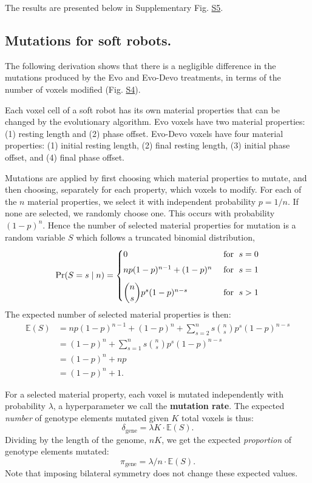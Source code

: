 The results are presented below in Supplementary Fig. \hyperref[fig:S5]{S5}.


\subsection{Mutations for soft robots.}

The following derivation shows that there is a negligible difference in the mutations produced by the Evo and Evo-Devo treatments, in terms of the number of voxels modified (Fig. \hyperref[fig:S4]{S4}). 

Each voxel cell of a soft robot has its own material properties that can be changed by the evolutionary algorithm.
Evo voxels have two material properties: (1) resting length and (2) phase offset.
Evo-Devo voxels have four material properties: (1) initial resting length, (2) final resting length, (3) initial phase offset, and (4) final phase offset.


Mutations are applied by first choosing which material properties to mutate, and then choosing, separately for each property, which voxels to modify.
For each of the $n$ material properties, we select it with independent probability $p=1/n$. 
If none are selected, we randomly choose one. This occurs with probability $\left(1-p\right)^n$.
Hence the number of selected material properties for mutation is a random variable $S$ which follows a truncated binomial distribution,
\begin{equation}
\text{Pr}(S = s \mid n) = 
	\begin{cases} 
        0 & \text{ for } \;  s = 0 \\[4pt]
        n p(1-p)^{n-1} + (1-p)^n & \text{ for } \;  s = 1 \\[8pt]
        \dbinom{n}{s} p^s (1-p)^{n-s} & \text{ for } \;  s > 1
	\end{cases}
\end{equation}
The expected number of selected material properties is then:
\begin{align}
\mathbb{E}(S) 
&=
np(1-p)^{n-1} + (1-p)^n + \sum_{s=2}^n s \binom{n}{s} p^s (1-p)^{n-s} \\
&= 
(1-p)^n + \sum_{s=1}^n s \binom{n}{s} p^s (1-p)^{n-s} \\
&= 
(1-p)^n + np \\
&= 
(1-p)^n+1 .
\end{align}


For a selected material property, 
each voxel is mutated independently with probability $\lambda$, a hyperparameter we call the \textbf{mutation rate}.
The expected \textit{number} of genotype elements mutated given $K$ total voxels is thus:
\begin{equation}
\delta_{\text{gene}} = \lambda K \cdot \mathbb{E}(S) .
\end{equation}
Dividing by the length of the genome, $nK$, we get the expected \textit{proportion} of genotype elements mutated:
\begin{equation}
\pi_{\text{gene}} = \lambda/n \cdot \mathbb{E}(S).
\end{equation}
Note that imposing bilateral symmetry does not change these expected values.

